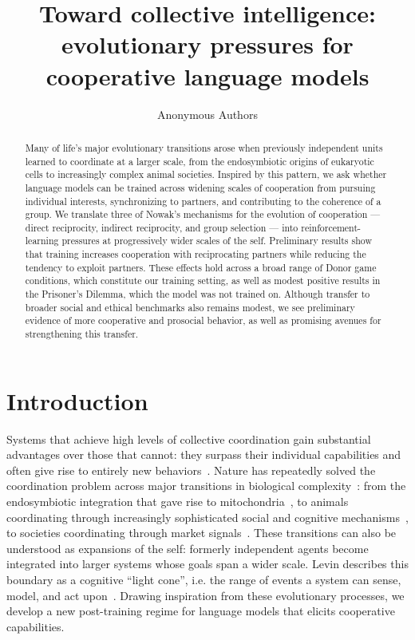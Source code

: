 \documentclass{article}
\title{Toward collective intelligence: evolutionary pressures for cooperative language models}
\author{
Anonymous Authors
}
\begin{document}
\maketitle

\begin{abstract}
\begin{abstract}
Many of life's major evolutionary transitions arose when previously independent units learned to coordinate at a larger scale, from the endosymbiotic origins of eukaryotic cells to increasingly complex animal societies. Inspired by this pattern, we ask whether language models can be trained across widening scales of cooperation from pursuing individual interests, synchronizing to partners, and contributing to the coherence of a group.
We translate three of Nowak's mechanisms for the evolution of cooperation --- direct reciprocity, indirect reciprocity, and group selection --- into reinforcement-learning pressures at progressively wider scales of the self.
Preliminary results show that training increases cooperation with reciprocating partners while reducing the tendency to exploit partners. These effects hold across a broad range of Donor game conditions, which constitute our training setting, as well as modest positive results in the Prisoner's Dilemma, which the model was not trained on. Although transfer to broader social and ethical benchmarks also remains modest, we see preliminary evidence of more cooperative and prosocial behavior, as well as promising avenues for strengthening this transfer.

\end{abstract}

\end{abstract}

\section{Introduction}

Systems that achieve high levels of collective coordination gain substantial
advantages over those that cannot: they surpass their individual capabilities
and often give rise to entirely new behaviors~\citep{levy1997}. Nature has
repeatedly solved the coordination problem across major transitions in
biological complexity~\citep{prokopenko2024}: from the endosymbiotic
integration that gave rise to mitochondria~\citep{zachar2020}, to animals
coordinating through increasingly sophisticated social and cognitive
mechanisms~\citep{bshary2006,melis2023}, to societies coordinating through
market signals~\citep{lyons2024}. These transitions can also be understood as
expansions of the self: formerly independent agents become integrated into
larger systems whose goals span a wider scale. Levin describes this boundary
as a cognitive ``light cone'', i.e. the range of events a system can sense,
model, and act upon~\citep{levin2019self}. Drawing inspiration from these
evolutionary processes, we develop a new post-training regime for language
models that elicits cooperative capabilities.
\end{document}
